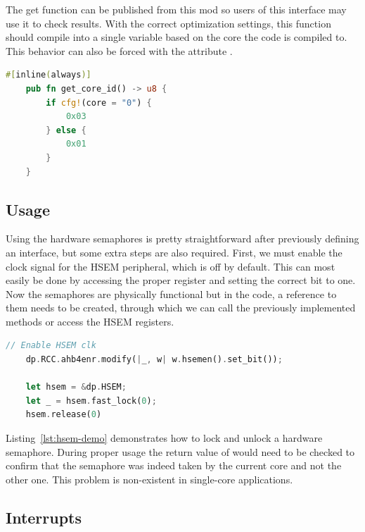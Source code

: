 The get  function can be published from this mod so users of this interface may use it to check results. With the correct optimization settings, this function should compile into a single variable based on the core the code is compiled to. This behavior can also be forced with the attribute .

\begin{lstlisting}[language=Rust,frame=single,float=!ht,style=customrust,label={lst:get-core-id},caption={The \mycode{get_core_id()} funtion}]
    #[inline(always)]
    pub fn get_core_id() -> u8 {
        if cfg!(core = "0") {
            0x03
        } else {
            0x01
        }
    }
\end{lstlisting}

\subsection{Usage}

Using the hardware semaphores is pretty straightforward after previously defining an interface, but some extra steps are also required. First, we must enable the clock signal for the HSEM peripheral, which is off by default. This can most easily be done by accessing the proper register and setting the correct bit to one. Now the semaphores are physically functional but in the code, a reference to them needs to be created, through which we can call the previously implemented methods or access the HSEM registers.

\begin{lstlisting}[language=Rust,frame=single,float=!ht,style=customrust,label={lst:hsem-demo},caption={Demonstration of HSEM Usage}]
    // Enable HSEM clk
    dp.RCC.ahb4enr.modify(|_, w| w.hsemen().set_bit());

    let hsem = &dp.HSEM;
    let _ = hsem.fast_lock(0);
    hsem.release(0)
\end{lstlisting}

Listing~\ref{lst:hsem-demo} demonstrates how to lock and unlock a hardware semaphore. During proper usage the return value of  would need to be checked to confirm that the semaphore was indeed taken by the current core and not the other one. This problem is non-existent in single-core applications.

\subsection{Interrupts}

